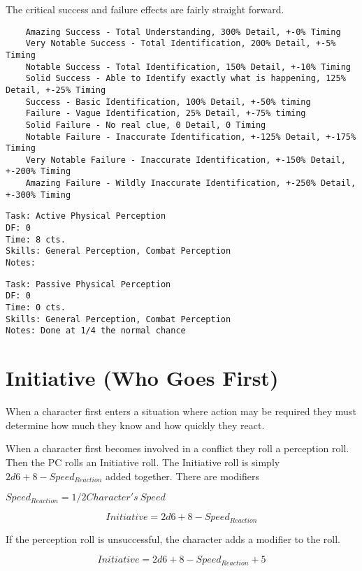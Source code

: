 The critical success and failure effects are fairly straight forward. 

\begin{verbatim}
	Amazing Success - Total Understanding, 300% Detail, +-0% Timing
	Very Notable Success - Total Identification, 200% Detail, +-5% Timing
    Notable Success - Total Identification, 150% Detail, +-10% Timing
	Solid Success - Able to Identify exactly what is happening, 125% Detail, +-25% Timing
	Success - Basic Identification, 100% Detail, +-50% timing
	Failure - Vague Identification, 25% Detail, +-75% timing
	Solid Failure - No real clue, 0 Detail, 0 Timing
	Notable Failure - Inaccurate Identification, +-125% Detail, +-175% Timing
	Very Notable Failure - Inaccurate Identification, +-150% Detail, +-200% Timing
	Amazing Failure - Wildly Inaccurate Identification, +-250% Detail, +-300% Timing
\end{verbatim}

\begin{verbatim}
Task: Active Physical Perception  
DF: 0 
Time: 8 cts. 
Skills: General Perception, Combat Perception
Notes: 
\end{verbatim}

\begin{verbatim}
Task: Passive Physical Perception  
DF: 0 
Time: 0 cts. 
Skills: General Perception, Combat Perception
Notes: Done at 1/4 the normal chance 
\end{verbatim}



\section{Initiative (Who Goes First)}

When a character first enters a situation where action may be required they must determine 
how much they know and how quickly they react.

When a character first becomes involved in a conflict they roll a perception roll. Then the PC rolls an {Initiative} roll. The 
Initiative roll is simply $ 2d6 + 8 - Speed_{Reaction} $ added together. There are modifiers 

$ Speed_{Reaction} = 1/2 {Character's\ Speed } $

\[{Initiative} = 2d6 + 8 - Speed_{Reaction}\]

If the perception roll is unsuccessful, the character adds a modifier 
to the roll. 

\[{Initiative} = 2d6 + 8 - Speed_{Reaction} + 5\]

